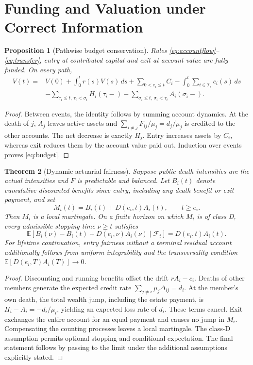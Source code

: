 \documentclass[11pt,a4paper]{article}
\newtheorem{theorem}{Theorem}[section]
\newtheorem{proposition}[theorem]{Proposition}
\theoremstyle{definition}\newtheorem{definition}[theorem]{Definition}
\theoremstyle{remark}\newtheorem{remark}[theorem]{Remark}
\newcommand{\E}{\mathbb E}
\newcommand{\calF}{\mathcal F}
\newcommand{\calI}{\mathcal I}
\begin{document}
\section{Funding and Valuation under Correct Information}
\begin{proposition}[Pathwise budget conservation]\label{prop:budget}
Rules \eqref{eq:accountflow}--\eqref{eq:transfer}, entry at contributed capital and exit at account value are fully funded. On every path,
\begin{align}\label{eq:budget}
V(t)={}&V(0)+\int_0^t r(s)V(s)\,ds
+\sum_{0<e_i\le t}C_i-\int_0^t\sum_{i\in\calI_s}c_i(s)\,ds\nonumber\\
&-\sum_{\tau_i\le t,\,\tau_i<\sigma_i}H_i(\tau_i-)
-\sum_{\sigma_i\le t,\,\sigma_i<\tau_i}A_i(\sigma_i-).
\end{align}
\end{proposition}
\begin{proof}
Between events, the identity follows by summing account dynamics. At the death of $j$, $A_j$ leaves active assets and $\sum_{i\ne j}F_{ij}/\mu_j=d_j/\mu_j$ is credited to the other accounts. The net decrease is exactly $H_j$. Entry increases assets by $C_i$, whereas exit reduces them by the account value paid out. Induction over events proves \eqref{eq:budget}.
\end{proof}

\begin{theorem}[Dynamic actuarial fairness]\label{thm:martingale}
Suppose public death intensities are the actual intensities and $F$ is predictable and balanced. Let $B_i(t)$ denote cumulative discounted benefits since entry, including any death-benefit or exit payment, and set
\[
M_i(t)=B_i(t)+D(e_i,t)A_i(t),\qquad t\ge e_i.
\]
Then $M_i$ is a local martingale. On a finite horizon on which $M_i$ is of class D, every admissible stopping time $\nu\ge t$ satisfies
\begin{equation}\label{eq:reserve}
\E\left[B_i(\nu)-B_i(t)+D(e_i,\nu)A_i(\nu)\mid\calF_t\right]
=D(e_i,t)A_i(t).
\end{equation}
For lifetime continuation, entry fairness without a terminal residual account additionally follows from uniform integrability and the transversality condition
$\E[D(e_i,T)A_i(T)]\to0$.
\end{theorem}
\begin{proof}
Discounting and running benefits offset the drift $rA_i-c_i$. Deaths of other members generate the expected credit rate $\sum_{j\ne i}\mu_j\Delta_{ij}=d_i$. At the member's own death, the total wealth jump, including the estate payment, is $H_i-A_i=-d_i/\mu_i$, yielding an expected loss rate of $d_i$. These terms cancel. Exit exchanges the entire account for an equal payment and causes no jump in $M_i$. Compensating the counting processes leaves a local martingale. The class-D assumption permits optional stopping and conditional expectation. The final statement follows by passing to the limit under the additional assumptions explicitly stated.
\end{proof}
\end{document}
